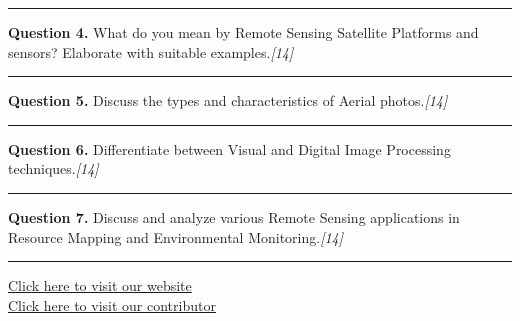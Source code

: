 \documentclass[11pt,a4paper]{article}
\newcommand{\pts}[1]{\hfill   \textit{[#1]}}
\begin{document}
\medskip\rule{\linewidth}{0.2pt}\medskip




\noindent   \textbf{Question 4.} What do you mean by Remote Sensing Satellite Platforms and sensors? Elaborate with suitable examples.\pts{14}

\medskip\rule{\linewidth}{0.2pt}\medskip




\noindent   \textbf{Question 5.} Discuss the types and characteristics of Aerial photos.\pts{14}

\medskip\rule{\linewidth}{0.2pt}\medskip




\noindent   \textbf{Question 6.} Differentiate between Visual and Digital Image Processing techniques.\pts{14}

\medskip\rule{\linewidth}{0.2pt}\medskip




\noindent   \textbf{Question 7.} Discuss and analyze various Remote Sensing applications in Resource Mapping and Environmental Monitoring.\pts{14}

\vfill
\rule{\linewidth}{0.4pt}

\begin{center}\small
\href{https://bhu-exam.vercel.app/}{Click here to visit our website}\\[4pt]
\href{https://me-aryan.vercel.app/}{Click here to visit our contributor}
\end{center}
\end{document}
